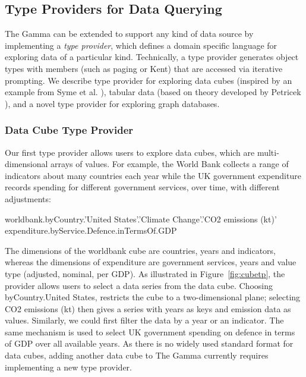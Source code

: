 \documentclass[manuscript,review,anonymous]{acmart}
\newcommand{\ikvd}[1]{{\fontfamily{zi4}\selectfont\small #1}}
\begin{document}
\subsection{Type Providers for Data Querying}
\label{sec:overview-tps}

The Gamma can be extended to support any kind of data source by implementing a \emph{type provider},
which defines a domain specific language for exploring data of a particular kind.
Technically, a type provider generates object types with members (such as \ikvd{paging} or \ikvd{Kent})
that are accessed via iterative prompting. We describe type provider for exploring data cubes
(inspired by an example from Syme et al. \cite{inforich}), tabular data (based on theory developed
by Petricek \cite{dotdriven}), and a novel type provider for exploring graph databases.

\subsubsection*{Data Cube Type Provider}
Our first type provider allows users to explore data cubes, which are multi-dimensional
arrays of values. For example, the World Bank collects a range of indicators about many countries
each year while the UK government expenditure records spending for different government services,
over time, with different adjustments:

\begin{thegamma}
worldbank.byCountry.'United States'.'Climate Change'.'CO2 emissions (kt)'
expenditure.byService.Defence.inTermsOf.GDP
\end{thegamma}

\noindent
The dimensions of the \ikvd{worldbank} cube are countries, years and indicators, whereas the dimensions
of \ikvd{expenditure} are government services, years and value type (adjusted, nominal,
per GDP).  As illustrated in Figure~\ref{fig:cubetp}, the provider allows users to select a data series
from the data cube. Choosing \ikvd{byCountry.\textquotesingle United States\textquotesingle},
restricts the cube to a two-dimensional plane; selecting \ikvd{\textquotesingle CO2 emissions (kt)\textquotesingle}
then gives a series with years as keys and emission data as values. Similarly, we could first filter the
data by a year or an indicator. The same mechanism is used to select UK government spending on
defence in terms of GDP over all available years.
As there is no widely used standard format for data cubes, adding another data cube to The Gamma
currently requires implementing a new type provider.
\end{document}
